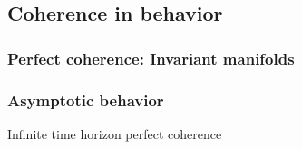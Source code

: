 \documentclass{article}
\theoremstyle{definition} \newtheorem{definition}{Definition}  \newtheorem{example}{Example}
\theoremstyle{remark} \newtheorem{remark}{Remark}
\newcounter{ct}
\begin{document}
%
%
%
%
%
%
%
%
%
%
%
%




\subsection{Coherence in behavior}
\subsubsection{Perfect coherence: Invariant manifolds}%


\subsubsection{Asymptotic behavior}\label{sec:asymptotic}
Infinite time horizon perfect coherence
\end{document}

